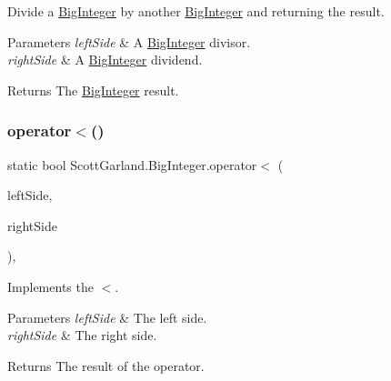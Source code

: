 Divide a \hyperlink{class_scott_garland_1_1_big_integer}{Big\+Integer} by another \hyperlink{class_scott_garland_1_1_big_integer}{Big\+Integer} and returning the result. 


\begin{DoxyParams}{Parameters}
{\em left\+Side} & A \hyperlink{class_scott_garland_1_1_big_integer}{Big\+Integer} divisor.\\
\hline
{\em right\+Side} & A \hyperlink{class_scott_garland_1_1_big_integer}{Big\+Integer} dividend.\\
\hline
\end{DoxyParams}
\begin{DoxyReturn}{Returns}
The \hyperlink{class_scott_garland_1_1_big_integer}{Big\+Integer} result.
\end{DoxyReturn}
\mbox{\label{class_scott_garland_1_1_big_integer_aff57d146e2a3e57c5a291b45bbb25636}} 
\subsubsection{\texorpdfstring{operator$<$()}{operator<()}}
{\footnotesize\ttfamily static bool Scott\+Garland.\+Big\+Integer.\+operator$<$ (\begin{DoxyParamCaption}\item[{\hyperlink{class_scott_garland_1_1_big_integer}{Big\+Integer}}]{left\+Side,  }\item[{\hyperlink{class_scott_garland_1_1_big_integer}{Big\+Integer}}]{right\+Side }\end{DoxyParamCaption})\hspace{0.3cm}{\ttfamily [inline]}, {\ttfamily [static]}}



Implements the $<$. 


\begin{DoxyParams}{Parameters}
{\em left\+Side} & The left side.\\
\hline
{\em right\+Side} & The right side.\\
\hline
\end{DoxyParams}
\begin{DoxyReturn}{Returns}
The result of the operator.
\end{DoxyReturn}

